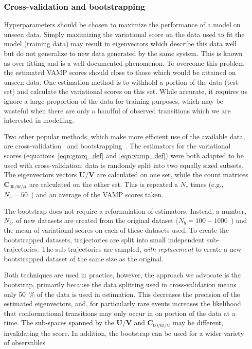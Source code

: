 \documentclass[journal=jacsat,manuscript=article]{achemso}
\begin{document}
\subsubsection{Cross-validation and bootstrapping}

Hyperparameters should be chosen to maximize the performance of a model on unseen data. Simply maximizing the variational score on the data used to fit the model (training data) may result in eigenvectors which describe this data well but do not generalize to new data generated by the same system. This is known as over-fitting and is a well documented phenomenon\cite{friedman2001elements}. To overcome this problem the estimated VAMP scores should close to those which would be attained on unseen data. One estimation method is to withhold a portion of the data (test set) and calculate the variational scores on this set. While accurate, it requires us ignore a large proportion of the data for training purposes, which may be wasteful when there are only a handful of observed transitions which we are interested in modelling. 

Two other popular methods, which make more efficient use of the available data,  are cross-validation~\cite{arlotSurveyCrossvalidationProcedures2009} and bootstrapping~\cite{efronIntroductionBootstrap1993}. The estimators for the variational scores (equations~\ref{eqn:gmrq_def} and \ref{eqn:vamp_def}) were both adapted to be used with cross-validation\cite{wuVariationalApproachLearning2020c, mcgibbonVariationalCrossvalidationSlow2015}: data is randomly split into two equally sized subsets. The eigenvectors vectors $\mathbf{U}/\mathbf{V}$ are calculated on one set, while the count matrices $\mathbf{C}_{00/0t/tt}$ are calculated on the other set.  This is repeated a $N_c$ times (e.g., $N_c =50$~\cite{scherer_variational_2019}) and an average of the VAMP scores taken.

The bootstrap does not require a reformulation of estimators. Instead, a number, $N_b$, of new datasets are created from the original dataset ($N_b = 100 - 1000$~\cite{efronIntroductionBootstrap1993}) and the mean of variational scores on each of these datasets used. To create the bootstrapped datasets, 
trajectories are split into small independent sub-trajectories. The sub-trajectories are sampled, \emph{with replacement} to create a new bootstrapped dataset of the same size as the original. 

Both techniques are used in practice, however, the approach we  advocate is the bootstrap, primarily because the data splitting used in cross-validation means only \SI{50}{\percent} of the data is used in estimation.  This decreases the precision of the estimated eigenvectors, and, for particularly rare events increases the likelihood  that conformational transitions may only occur in on portion of the data at a time. The sub-spaces spanned by the $\mathbf{U}/\mathbf{V}$ and $\mathbf{C}_{00/0t/tt}$ may be different, invalidating the score. In addition, the bootstrap can be used for a wider variety of observables 
 
\end{document}
